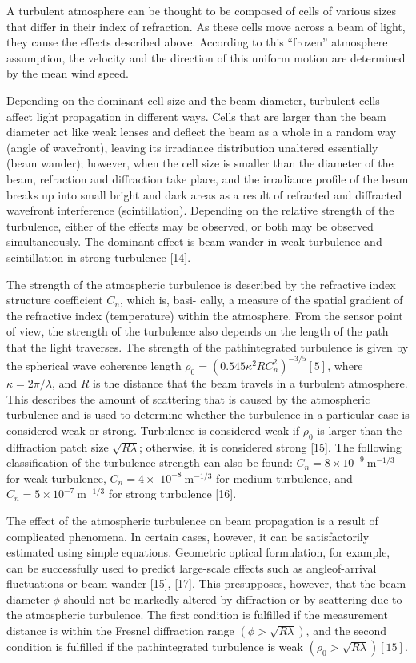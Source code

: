 \documentclass[10pt]{article}
\begin{document}
A turbulent atmosphere can be thought to be composed of cells of various sizes that differ in their index of refraction. As these cells move across a beam of light, they cause the effects described above. According to this “frozen” atmosphere assumption, the velocity and the direction of this uniform motion are determined by the mean wind speed.

Depending on the dominant cell size and the beam diameter, turbulent cells affect light propagation in different ways. Cells that are larger than the beam diameter act like weak lenses and deflect the beam as a whole in a random way (angle of wavefront), leaving its irradiance distribution unaltered essentially (beam wander); however, when the cell size is smaller than the diameter of the beam, refraction and diffraction take place, and the irradiance profile of the beam breaks up into small bright and dark areas as a result of refracted and diffracted wavefront interference (scintillation). Depending on the relative strength of the turbulence, either of the effects may be observed, or both may be observed simultaneously. The dominant effect is beam wander in weak turbulence and scintillation in strong turbulence [14].

The strength of the atmospheric turbulence is described by the refractive index structure coefficient \(C_{n}\), which is, basi- cally, a measure of the spatial gradient of the refractive index (temperature) within the atmosphere. From the sensor point of view, the strength of the turbulence also depends on the length of the path that the light traverses. The strength of the pathintegrated turbulence is given by the spherical wave coherence length \(\rho_{0}=\left(0.545 \kappa^{2} R C_{n}^{2}\right)^{-3 / 5}[5]\), where \(\kappa=2 \pi / \lambda\), and \(R\) is the distance that the beam travels in a turbulent atmosphere. This describes the amount of scattering that is caused by the atmospheric turbulence and is used to determine whether the turbulence in a particular case is considered weak or strong. Turbulence is considered weak if \(\rho_{0}\) is larger than the diffraction patch size \(\sqrt{R \lambda}\); otherwise, it is considered strong [15]. The following classification of the turbulence strength can also be found: \(C_{n}=8 \times 10^{-9} \mathrm{~m}^{-1 / 3}\) for weak turbulence, \(C_{n}=4 \times\) \(10^{-8} \mathrm{~m}^{-1 / 3}\) for medium turbulence, and \(C_{n}=5 \times 10^{-7} \mathrm{~m}^{-1 / 3}\) for strong turbulence [16].

The effect of the atmospheric turbulence on beam propagation is a result of complicated phenomena. In certain cases, however, it can be satisfactorily estimated using simple equations. Geometric optical formulation, for example, can be successfully used to predict large-scale effects such as angleof-arrival fluctuations or beam wander [15], [17]. This presupposes, however, that the beam diameter \(\phi\) should not be markedly altered by diffraction or by scattering due to the atmospheric turbulence. The first condition is fulfilled if the measurement distance is within the Fresnel diffraction range \((\phi>\sqrt{R \lambda})\), and the second condition is fulfilled if the pathintegrated turbulence is weak \(\left(\rho_{0}>\sqrt{R \lambda}\right)[15]\).
\end{document}
